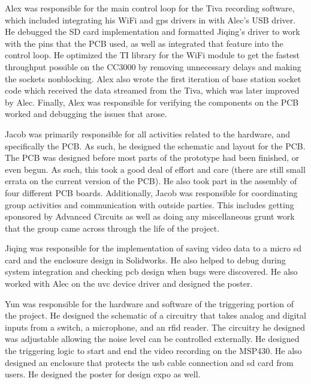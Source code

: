 \documentclass[12pt]{article}
\begin{document}
Alex was responsible for the main control loop for the Tiva recording software,
which included integrating his WiFi and \gls{gps} drivers in with Alec's USB driver.
He debugged the SD card implementation and formatted Jiqing's driver to work with
the pins that the PCB used, as well as integrated that feature into the control loop. 
He optimized the TI library for the WiFi module to get the fastest throughput
possible on the CC3000 by removing unnecessary delays and making the sockets
nonblocking. Alex also wrote the first iteration of base station socket code
which received the data streamed from the Tiva, which was later improved by
Alec. Finally, Alex was responsible for verifying the components on the PCB
worked and debugging the issues that arose.

Jacob was primarily responsible for all activities related to the hardware, and
specifically the PCB. As such, he designed the schematic and layout for the
PCB. The PCB was designed before most parts of the prototype had been finished,
or even begun. As such, this took a good deal of effort and care (there are
still small errata on the current version of the PCB). He also took part in the
assembly of four different PCB boards. Additionally, Jacob was responsible for
coordinating group activities and communication with outside parties. This
includes getting sponsored by Advanced Circuits as well as doing any
miscellaneous grunt work that the group came across through the life of the
project.

Jiqing was responsible for the implementation of saving video data to a micro
\gls{sd} card and the enclosure design in Solidworks. He also helped to debug
during system integration and checking \gls{pcb} design when bugs were
discovered.  He also worked with Alec on the \gls{uvc} device driver and
designed the poster.

Yun was responsible for the hardware and software of the triggering portion of
the project. He designed the schematic of a circuitry that takes analog and
digital inputs from a switch, a microphone, and an \gls{rfid} reader. The
circuitry he designed was adjustable allowing the noise level can be controlled
externally.  He designed the triggering logic to start and end the video
recording on the MSP430. He also designed an enclosure that protects the
\gls{usb} cable connection and \gls{sd} card from users. He designed the poster
for design expo as well.
\end{document}
